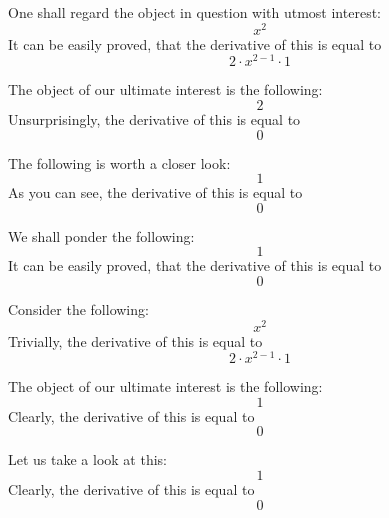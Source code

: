 \documentclass{article}
\begin{document}
One shall regard the object in question with utmost interest:
\begin{equation}
x ^{2 } 
\end{equation}
It can be easily proved, that the derivative of this is equal to
\begin{equation}
2 \cdot x ^{2 - 1 } \cdot 1 
\end{equation}

The object of our ultimate interest is the following:
\begin{equation}
2 
\end{equation}
Unsurprisingly, the derivative of this is equal to
\begin{equation}
0 
\end{equation}

The following is worth a closer look:
\begin{equation}
1 
\end{equation}
As you can see, the derivative of this is equal to
\begin{equation}
0 
\end{equation}

We shall ponder the following:
\begin{equation}
1 
\end{equation}
It can be easily proved, that the derivative of this is equal to
\begin{equation}
0 
\end{equation}

Consider the following:
\begin{equation}
x ^{2 } 
\end{equation}
Trivially, the derivative of this is equal to
\begin{equation}
2 \cdot x ^{2 - 1 } \cdot 1 
\end{equation}

The object of our ultimate interest is the following:
\begin{equation}
1 
\end{equation}
Clearly, the derivative of this is equal to
\begin{equation}
0 
\end{equation}

Let us take a look at this:
\begin{equation}
1 
\end{equation}
Clearly, the derivative of this is equal to
\begin{equation}
0 
\end{equation}
\end{document}
